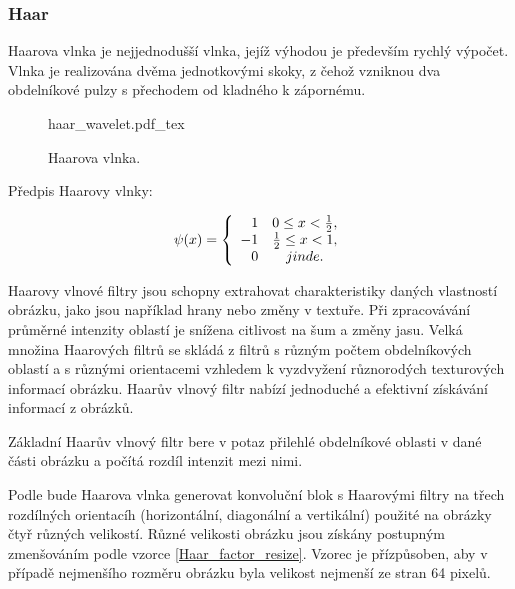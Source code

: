 \documentclass[czech,BP]{thesiskiv}
\begin{document}
\subsubsection{Haar}
\par Haarova vlnka je nejjednodušší vlnka, jejíž výhodou je především rychlý výpočet. Vlnka je realizována dvěma jednotkovými skoky, z čehož vzniknou dva obdelníkové pulzy s přechodem od kladného k zápornému. 

\begin{figure}[H]
    \centering
    \def\svgwidth{200px}
    {haar_wavelet.pdf_tex} 
    \caption{Haarova vlnka.}
\end{figure} 

Předpis Haarovy vlnky:

\begin{displaymath} 
	\label{haar} 
		    \psi(x) = \left\{ \begin{array}{r@{\quad}c}
    		1 & 0 \leq x < \frac{1}{2}, \\
    		-1 & \frac{1}{2} \leq x < 1, \\ 
    		0 & jinde. \\  \end{array} \right. 
\end{displaymath} 
\vspace{1cm}


\par Haarovy vlnové filtry jsou schopny extrahovat charakteristiky daných vlastností obrázku, jako jsou například hrany nebo změny v textuře.  Při zpracovávání průměrné intenzity oblastí je snížena citlivost na šum a změny jasu. Velká množina Haarových filtrů se skládá z filtrů s různým počtem obdelníkových oblastí a s různými orientacemi vzhledem k vyzdvyžení různorodých texturových informací obrázku. Haarův vlnový filtr nabízí jednoduché a efektivní získávání informací z obrázků.
\par Základní Haarův vlnový filtr bere v potaz přilehlé obdelníkové oblasti v dané části obrázku a počítá rozdíl intenzit mezi nimi. 
 
\par Podle \citep{JEC} bude Haarova vlnka generovat konvoluční blok s Haarovými filtry na třech rozdílných orientacíh (horizontální, diagonální a vertikální) použité na obrázky čtyř různých velikostí. Různé velikosti obrázku jsou získány postupným zmenšováním podle vzorce \ref{Haar_factor_resize}. Vzorec je přízpůsoben, aby v případě nejmenšího rozměru obrázku byla velikost nejmenší ze stran 64 pixelů. 
\end{document}

